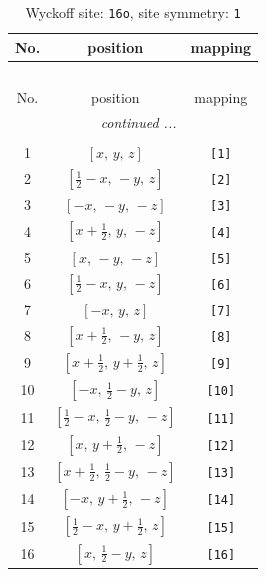 \documentclass[fleqn,8pt]{jsarticle}
\begin{document}
\begin{longtable}{ccc}
\caption{Wyckoff site: {\tt 16o}, site symmetry: {\tt 1}}
 \\
 \hline \hline
No. & position & mapping \\ \hline \endfirsthead

\multicolumn{2}{l}{\tablename\ \thetable{}} \\
 \hline \hline
No. & position & mapping \\ \hline \endhead

 \hline \hline
\multicolumn{2}{r}{\footnotesize\it continued ...} \\ \endfoot

 \hline \hline
\multicolumn{2}{r}{} \\ \endlastfoot

1 & $\left[ x,\, y,\, z \right]$ & {\tt [1]} \\ \hline
2 & $\left[ \frac{1}{2} - x,\, - y,\, z \right]$ & {\tt [2]} \\ \hline
3 & $\left[ - x,\, - y,\, - z \right]$ & {\tt [3]} \\ \hline
4 & $\left[ x + \frac{1}{2},\, y,\, - z \right]$ & {\tt [4]} \\ \hline
5 & $\left[ x,\, - y,\, - z \right]$ & {\tt [5]} \\ \hline
6 & $\left[ \frac{1}{2} - x,\, y,\, - z \right]$ & {\tt [6]} \\ \hline
7 & $\left[ - x,\, y,\, z \right]$ & {\tt [7]} \\ \hline
8 & $\left[ x + \frac{1}{2},\, - y,\, z \right]$ & {\tt [8]} \\ \hline
9 & $\left[ x + \frac{1}{2},\, y + \frac{1}{2},\, z \right]$ & {\tt [9]} \\ \hline
10 & $\left[ - x,\, \frac{1}{2} - y,\, z \right]$ & {\tt [10]} \\ \hline
11 & $\left[ \frac{1}{2} - x,\, \frac{1}{2} - y,\, - z \right]$ & {\tt [11]} \\ \hline
12 & $\left[ x,\, y + \frac{1}{2},\, - z \right]$ & {\tt [12]} \\ \hline
13 & $\left[ x + \frac{1}{2},\, \frac{1}{2} - y,\, - z \right]$ & {\tt [13]} \\ \hline
14 & $\left[ - x,\, y + \frac{1}{2},\, - z \right]$ & {\tt [14]} \\ \hline
15 & $\left[ \frac{1}{2} - x,\, y + \frac{1}{2},\, z \right]$ & {\tt [15]} \\ \hline
16 & $\left[ x,\, \frac{1}{2} - y,\, z \right]$ & {\tt [16]} \\
\end{longtable}
\end{document}
